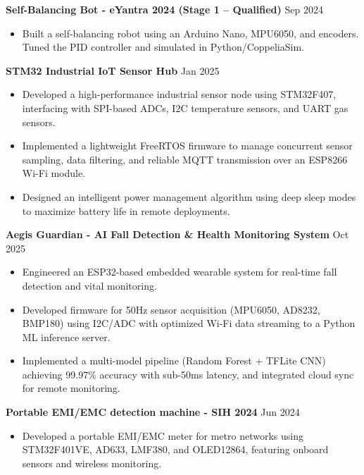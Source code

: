 \documentclass[10pt,a4paper]{article}%
\begin{document}
\noindent \textbf{Self-Balancing Bot - eYantra 2024 (Stage 1 – Qualified)} \hfill Sep 2024%
\begin{itemize}[leftmargin=15pt, nosep, topsep=0pt]%
\item Built a self-balancing robot using an Arduino Nano, MPU6050, and encoders. Tuned the PID controller and simulated in Python/CoppeliaSim.%
\end{itemize} \vspace{8pt}

\noindent \textbf{STM32 Industrial IoT Sensor Hub} \hfill Jan 2025%
\begin{itemize}[leftmargin=15pt, nosep, topsep=0pt]%
\item Developed a high-performance industrial sensor node using STM32F407, interfacing with SPI-based ADCs, I2C temperature sensors, and UART gas sensors.%
\item Implemented a lightweight FreeRTOS firmware to manage concurrent sensor sampling, data filtering, and reliable MQTT transmission over an ESP8266 Wi-Fi module.%
\item Designed an intelligent power management algorithm using deep sleep modes to maximize battery life in remote deployments.%
\end{itemize} \vspace{8pt}

\noindent \textbf{Aegis Guardian - AI Fall Detection \& Health Monitoring System} \hfill Oct 2025%
\begin{itemize}[leftmargin=15pt, nosep, topsep=0pt]%
\item Engineered an ESP32-based embedded wearable system for real-time fall detection and vital monitoring.%
\item Developed firmware for 50Hz sensor acquisition (MPU6050, AD8232, BMP180) using I2C/ADC with optimized Wi-Fi data streaming to a Python ML inference server.%
\item Implemented a multi-model pipeline (Random Forest + TFLite CNN) achieving 99.97\% accuracy with sub-50ms latency, and integrated cloud sync for remote monitoring.%
\end{itemize} \vspace{8pt}

\noindent \textbf{Portable EMI/EMC detection machine - SIH 2024} \hfill Jun 2024%
\begin{itemize}[leftmargin=15pt, nosep, topsep=0pt]%
\item Developed a portable EMI/EMC meter for metro networks using STM32F401VE, AD633, LMF380, and OLED12864, featuring onboard sensors and wireless monitoring.%
\end{itemize} \vspace{8pt}
\end{document}
